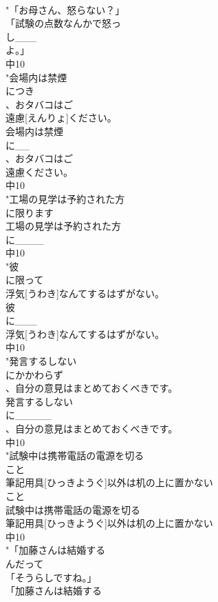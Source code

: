 \documentclass[8pt]{extreport}
\begin{document}
\begin{CJK}{UTF8}{min}
\\	"「お母さん、怒らない？」
\\	「試験の点数なんかで怒っ
\\	し___
\\	よ。」
\\	中10
\\	"会場内は禁煙
\\	につき
\\	、おタバコはご
\\	遠慮[えんりょ]ください。
\\	会場内は禁煙
\\	に__
\\	、おタバコはご
\\	遠慮ください。
\\	中10
\\	"工場の見学は予約された方
\\	に限ります
\\	工場の見学は予約された方
\\	に____
\\	中10
\\	"彼
\\	に限って
\\	浮気[うわき]なんてするはずがない。
\\	彼
\\	に___
\\	浮気[うわき]なんてするはずがない。
\\	中10
\\	"発言するしない
\\	にかかわらず
\\	、自分の意見はまとめておくべきです。
\\	発言するしない
\\	に_____
\\	、自分の意見はまとめておくべきです。
\\	中10
\\	"試験中は携帯電話の電源を切る
\\	こと
\\	筆記用具[ひっきようぐ]以外は机の上に置かない
\\	こと
\\	試験中は携帯電話の電源を切る
\\	筆記用具[ひっきようぐ]以外は机の上に置かない
\\	中10
\\	"「加藤さんは結婚する
\\	んだって
\\	「そうらしですね。」
\\	「加藤さんは結婚する

\end{CJK}
\end{document}
